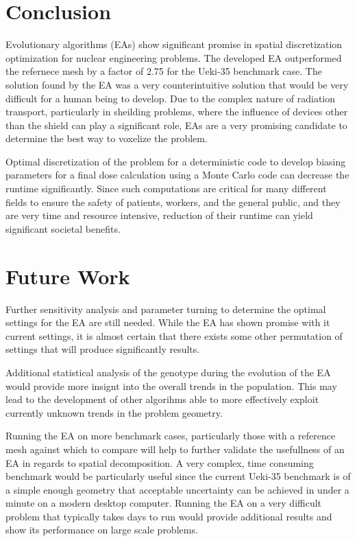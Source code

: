 \documentclass[conference]{IEEEtran}
\begin{document}

\section{Conclusion}
Evolutionary algorithms (EAs) show significant promise in spatial discretization optimization for nuclear engineering problems. The developed EA outperformed the refernece mesh by a factor of 2.75 for the Ueki-35 benchmark case. The solution found by the EA was a very counterintuitive solution that would be very difficult for a human being to develop. Due to the complex nature of radiation transport, particularly in sheilding problems, where the influence of devices other than the shield can play a significant role, EAs are a very promising candidate to determine the best way to voxelize the problem. 

Optimal discretization of the problem for a deterministic code to develop biasing parameters for a final dose calculation using a Monte Carlo code can decrease the runtime significantly. Since such computations are critical for many different fields to ensure the safety of patients, workers, and the general public, and they are very time and resource intensive, reduction of their runtime can yield significant societal benefits.

\section{Future Work}
Further sensitivity analysis and parameter turning to determine the optimal settings for the EA are still needed. While the EA has shown promise with it current settings, it is almost certain that there exists some other permutation of settings that will produce significantly results.

Additional statistical analysis of the genotype during the evolution of the EA would provide more insignt into the overall trends in the population. This may lead to the development of other algorihms able to more effectively exploit currently unknown trends in the problem geometry.

Running the EA on more benchmark cases, particularly those with a reference mesh against which to compare will help to further validate the usefullness of an EA in regards to spatial decomposition. A very complex, time consuming benchmark would be particularly useful since the current Ueki-35 benchmark is of a simple enough geometry that acceptable uncertainty can be achieved in under a minute on a modern desktop computer. Running the EA on a very difficult problem that typically takes days to run would provide additional results and show its performance on large scale problems.
\end{document}
